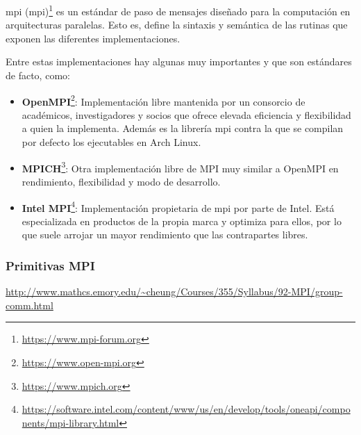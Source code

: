 \acrshort{mpi} (\acrlong{mpi})\footnote{\url{https://www.mpi-forum.org}} es un estándar de paso de mensajes diseñado para la computación en arquitecturas paralelas. Esto es, define la sintaxis y semántica de las rutinas que exponen las diferentes implementaciones.

Entre estas implementaciones hay algunas muy importantes y que son estándares de facto, como:
\begin{itemize}
  \item\textbf{OpenMPI}\footnote{\url{https://www.open-mpi.org}}: Implementación libre mantenida por un consorcio de académicos, investigadores y socios que ofrece elevada eficiencia y flexibilidad a quien la implementa. Además es la librería \acrshort{mpi} contra la que se compilan por defecto los ejecutables en Arch Linux.
  \item\textbf{MPICH}\footnote{\url{https://www.mpich.org}}: Otra implementación libre de MPI muy similar a OpenMPI en rendimiento, flexibilidad y modo de desarrollo.
  \item\textbf{Intel MPI}\footnote{\url{https://software.intel.com/content/www/us/en/develop/tools/oneapi/components/mpi-library.html}}: Implementación propietaria de \acrshort{mpi} por parte de Intel. Está especializada en productos de la propia marca y optimiza para ellos, por lo que suele arrojar un mayor rendimiento que las contrapartes libres.
\end{itemize}

\subsubsection{Primitivas MPI}
\url{http://www.mathcs.emory.edu/\~cheung/Courses/355/Syllabus/92-MPI/group-comm.html}